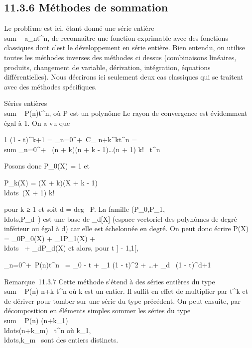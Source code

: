 \documentclass[]{article}
\begin{document}
\subsection{11.3.6 Méthodes de sommation}

Le problème est ici, étant donné une série entière
\\sum ~
a_nt^n, de reconnaître une fonction exprimable avec
des fonctions classiques dont c'est le développement en série entière.
Bien entendu, on utilise toutes les méthodes inverses des méthodes ci
dessus (combinaisons linéaires, produits, changement de variable,
dérivation, intégration, équations différentielles). Nous décrirons ici
seulement deux cas classiques qui se traitent avec des méthodes
spécifiques.

Séries entières \\sum ~
P(n)t^n, où P est un polynôme Le rayon de convergence est
évidemment égal à 1. On a vu que

 1 \over (1 - t)^k+1 =
\sum _n=0^+\infty~C_
n+k^kt^n = \\sum
_n=0^+\infty~ (n + k)(n + k -
1)\ldots(n + 1) \over k!~
t^n

Posons donc P_0(X) = 1 et

P_k(X) = (X + k)(X + k -
1)\\ldots~(X + 1)
\over k!

pour k ≥ 1 et soit d = deg~ P. La famille
(P_0,P_1,\\ldots,P_d~)
est une base de _d[X] (espace vectoriel des polynômes de
degré inférieur ou égal à d) car elle est échelonnée en degré. On peut
donc écrire P(X) = \lambda_0P_0(X) +
\lambda_1P_1(X) +
\\ldots~ +
\lambda_dP_d(X) et alors, pour t \in] - 1,1[,

\sum _n=0^+\infty~P(n)t^n~
= \lambda_0  - t + \lambda_1
\over (1 - t)^2 +
\ldots + \lambda_d~ \over
(1 - t)^d+1

Remarque~11.3.7 Cette méthode s'étend à des séries entières du type
\\sum ~  P(n)
\over n+k t^n où k est un entier. Il suffit
en effet de multiplier par t^k et de dériver pour tomber sur
une série du type précédent. On peut ensuite, par décomposition en
éléments simples sommer les séries du type
\\sum ~  P(n)
\over
(n+k_1)\\ldots(n+k_m)~
t^n où
k_1,\\ldots,k_m~
sont des entiers distincts.
\end{document}
